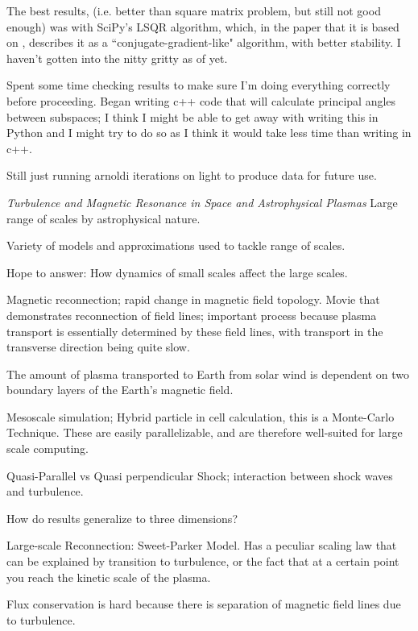 \begin{description}
{\begin{description}
The best results, (i.e. better than square matrix problem, but still not
good enough) was with SciPy's LSQR algorithm, which, in the paper that
it is based on , describes it as a ``conjugate-gradient-like" algorithm,
with better stability. I haven't gotten into the nitty gritty as of yet.


\item[Floquet vectors]
Spent some time checking results to make sure I'm doing everything correctly before proceeding.
Began writing c++ code that will calculate principal angles between subspaces; I think I might
be able to get away with writing this in Python and I might try to do so as I think it would
take less time than writing in c++.

Still just running arnoldi iterations on light to produce data for future use.

\item[Physics Colloquium: Vadim Roytershteyn]
\textit{Turbulence and Magnetic Resonance in Space and Astrophysical Plasmas}
Large range of scales by astrophysical nature.

Variety of models and approximations used to tackle range of scales.

Hope to answer: How dynamics of small scales affect the large scales.

Magnetic reconnection; rapid change in magnetic field topology.
Movie that demonstrates reconnection of field lines; important process
because plasma transport is essentially determined by these field lines,
with transport in the transverse direction being quite slow.

The amount of plasma transported to Earth from solar wind is dependent
on two boundary layers of the Earth's magnetic field.

Mesoscale simulation; Hybrid particle in cell calculation, this is a Monte-Carlo Technique.
These are easily parallelizable, and are therefore well-suited for large scale computing.

Quasi-Parallel vs Quasi perpendicular Shock; interaction between shock waves and
turbulence.

How do results generalize to three dimensions?

Large-scale Reconnection: Sweet-Parker Model.
Has a peculiar scaling law that can be explained by transition to turbulence,
or the fact that at a certain point you reach the kinetic scale of the plasma.

Flux conservation is hard because there is separation of magnetic field
lines due to turbulence.


\end{description}}
\end{description}
